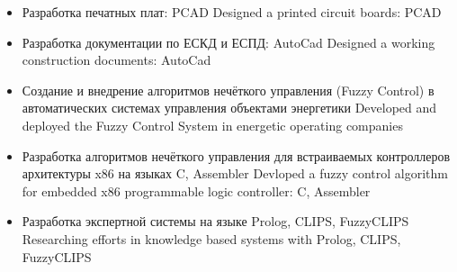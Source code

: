 \documentclass[11pt,a4paper,sans]{moderncv}        %
\begin{document}
{\begin{itemize}
		{Разработка электрических принципиальных схем: PCAD}
		{Designed a schematic circuit diagrams: PCAD}
	\item {}
		{Разработка печатных плат: PCAD}
		{Designed a printed circuit boards: PCAD}
	\item {}
		{Разработка документации по ЕСКД и ЕСПД: AutoCad}
		{Designed a working construction documents: AutoCad}
	\item {}
		{Создание и внедрение алгоритмов нечёткого управления (Fuzzy Control) в автоматических системах управления объектами энергетики}
		{Developed and deployed the Fuzzy Control System in energetic operating companies}
	\item {}
		{Разработка алгоритмов нечёткого управления для встраиваемых контроллеров архитектуры x86 на языках C, Assembler}
		{Devloped a fuzzy control algorithm for embedded x86 programmable logic controller: C, Assembler}
	\item {}
		{Разработка экспертной системы на языке Prolog, CLIPS, FuzzyCLIPS}
		{Researching efforts in knowledge based systems with Prolog, CLIPS, FuzzyCLIPS}	
\end{itemize}
}

\pagebreak


{}
{}
{}
{}

\end{document}
